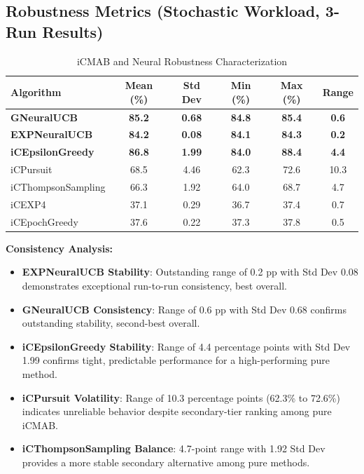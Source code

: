 \documentclass[12pt,a4paper]{article}
\newcommand{\secondarytext}[1]{\textcolor{secondaryblue}{\textbf{#1}}}
\newcommand{\success}[1]{\textcolor{accentgreen}{\textbf{#1}}}
\newcommand{\warning}[1]{\textcolor{warningred}{\textbf{#1}}}
\newcommand{\legacy}[1]{\textcolor{legacycolor}{\textbf{#1}}}
\newcommand{\neural}[1]{\textcolor{neuralcolor}{\textbf{#1}}}
\begin{document}
\subsection{Robustness Metrics (Stochastic Workload, 3-Run Results)}

\begin{table}[H]
\centering
\caption{iCMAB and Neural Robustness Characterization}
\label{tab:robustness}
\begin{tabular}{@{}lccccc@{}}
\toprule
\textbf{Algorithm} & \textbf{Mean (\%)} & \textbf{Std Dev} & \textbf{Min (\%)} & \textbf{Max (\%)} & \textbf{Range} \\
\midrule
\neural{GNeuralUCB}        & \neural{85.2} & \neural{0.68} & \neural{84.8} & \neural{85.4} & \neural{0.6} \\
\legacy{EXPNeuralUCB}       & \legacy{84.2} & \legacy{0.08} & \legacy{84.1} & \legacy{84.3} & \legacy{0.2} \\
\success{iCEpsilonGreedy}   & \success{86.8} & \success{1.99} & \success{84.0} & \success{88.4} & \success{4.4} \\
iCPursuit                   & 68.5 & 4.46 & 62.3 & 72.6 & 10.3 \\
iCThompsonSampling          & 66.3 & 1.92 & 64.0 & 68.7 & 4.7 \\
iCEXP4                      & 37.1 & 0.29 & 36.7 & 37.4 & 0.7 \\
iCEpochGreedy               & 37.6 & 0.22 & 37.3 & 37.8 & 0.5 \\
\bottomrule
\end{tabular}
\end{table}

\textbf{Consistency Analysis:}
\begin{itemize}
\item \legacy{EXPNeuralUCB Stability}: Outstanding range of 0.2 pp with Std Dev 0.08 demonstrates exceptional run-to-run consistency, best overall.
\item \neural{GNeuralUCB Consistency}: Range of 0.6 pp with Std Dev 0.68 confirms outstanding stability, second-best overall.
\item \success{iCEpsilonGreedy Stability}: Range of 4.4 percentage points with Std Dev 1.99 confirms tight, predictable performance for a high-performing pure method.
\item \warning{iCPursuit Volatility}: Range of 10.3 percentage points (62.3\% to 72.6\%) indicates unreliable behavior despite secondary-tier ranking among pure iCMAB.
\item \secondarytext{iCThompsonSampling Balance}: 4.7-point range with 1.92 Std Dev provides a more stable secondary alternative among pure methods.
\end{itemize}
\end{document}
